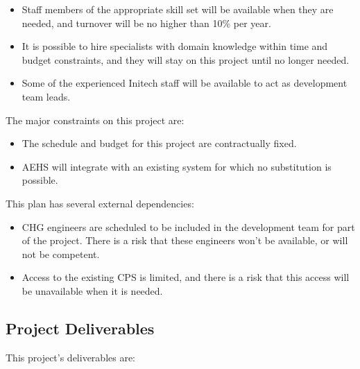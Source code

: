 \documentclass[11pt]{article}
\begin{document}
\begin{itemize}
\item Staff members of the appropriate skill set will be available when they are needed, and turnover
  will be no higher than 10\% per year.
\item It is possible to hire specialists with domain knowledge within time and budget constraints,
  and they will stay on this project until no longer needed.
\item Some of the experienced Initech staff will be available to act as development team leads.
\end{itemize}

The major constraints on this project are:

\begin{itemize}
\item The schedule and budget for this project are contractually fixed.
\item AEHS will integrate with an existing system for which no substitution is possible.
\end{itemize}

This plan has several external dependencies:

\begin{itemize}
\item CHG engineers are scheduled to be included in the development team for part of the project.
  There is a risk that these engineers won't be available, or will not be competent.
\item Access to the existing CPS is limited, and there is a risk that this access will be
  unavailable when it is needed.
\end{itemize}

\subsection{Project Deliverables}
This project's deliverables are:
\end{document}
